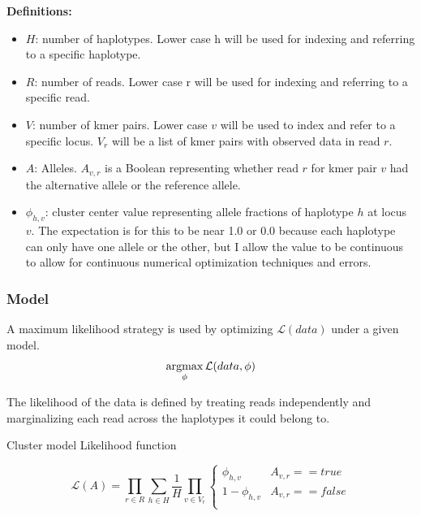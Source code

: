 \textbf{Definitions:}
\begin{itemize}
\item $H$: number of haplotypes. Lower case h will be used for indexing and referring to a specific haplotype.
\item $R$: number of reads. Lower case r will be used for indexing and referring to a specific read. 
\item $V$: number of kmer pairs. Lower case $v$ will be used to index and refer to a specific locus. $V_r$ will be a list of kmer pairs with observed data in read $r$.
\item $A$: Alleles. $A_{v,r}$ is a Boolean representing whether read $r$ for kmer pair $v$ had the alternative allele or the reference allele.
\item $\phi_{h,v}$: cluster center value representing allele fractions of haplotype $h$ at locus $v$. The expectation is for this to be near 1.0 or 0.0 because each haplotype can only have one allele or the other, but I allow the value to be continuous to allow for continuous numerical optimization techniques and errors.
\end{itemize}

\noindent
\subsubsection{Model}

A maximum likelihood strategy is used by optimizing $\mathcal{L}(data)$ under a given model. 
\begin{equation}
\operatorname*{argmax}_{\phi} \mathcal{L}(data, \phi)
\end{equation}


The likelihood of the data is defined by treating reads independently and marginalizing each read across the haplotypes it could belong to. 

Cluster model Likelihood function

\begin{equation}
\mathcal{L}(A) = \prod_{r \in R} \sum_{h \in H} \frac{1}{H} \prod_{v \in V_r} \begin{cases}       \phi_{h,v} & A_{v,r} == true \\      1 - \phi_{h,v} & A_{v,r} == false \\
\end{cases}
\end{equation}

